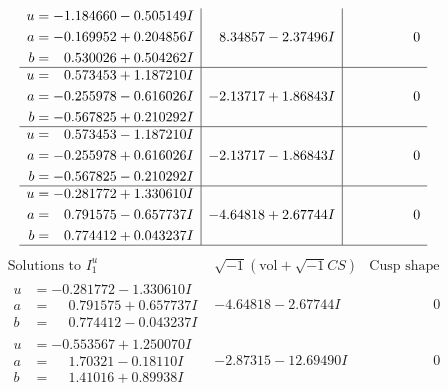 \documentclass[1p]{elsarticle_modified}
\theoremstyle{definition}
\newcommand{\I}{\sqrt{-1}}
\begin{document}
$$\begin{array}{c|c|c}
\begin{aligned}
u &= -1.184660 - 0.505149 I \\
a &= -0.169952 + 0.204856 I \\
b &= \phantom{-}0.530026 + 0.504262 I\end{aligned}
 & \phantom{-}8.34857 - 2.37496 I & \phantom{-0.000000 } 0 \\ \hline\begin{aligned}
u &= \phantom{-}0.573453 + 1.187210 I \\
a &= -0.255978 - 0.616026 I \\
b &= -0.567825 + 0.210292 I\end{aligned}
 & -2.13717 + 1.86843 I & \phantom{-0.000000 } 0 \\ \hline\begin{aligned}
u &= \phantom{-}0.573453 - 1.187210 I \\
a &= -0.255978 + 0.616026 I \\
b &= -0.567825 - 0.210292 I\end{aligned}
 & -2.13717 - 1.86843 I & \phantom{-0.000000 } 0 \\ \hline\begin{aligned}
u &= -0.281772 + 1.330610 I \\
a &= \phantom{-}0.791575 - 0.657737 I \\
b &= \phantom{-}0.774412 + 0.043237 I\end{aligned}
 & -4.64818 + 2.67744 I & \phantom{-0.000000 } 0\\
 \hline 
 \end{array}$$\newpage$$\begin{array}{c|c|c}  
\text{Solutions to }I^u_{1}& \I (\text{vol} + \sqrt{-1}CS) & \text{Cusp shape}\\
 \hline 
\begin{aligned}
u &= -0.281772 - 1.330610 I \\
a &= \phantom{-}0.791575 + 0.657737 I \\
b &= \phantom{-}0.774412 - 0.043237 I\end{aligned}
 & -4.64818 - 2.67744 I & \phantom{-0.000000 } 0 \\ \hline\begin{aligned}
u &= -0.553567 + 1.250070 I \\
a &= \phantom{-}1.70321 - 0.18110 I \\
b &= \phantom{-}1.41016 + 0.89938 I\end{aligned}
 & -2.87315 - 12.69490 I & \phantom{-0.000000 } 0 \\ \hline\begin{aligned}

\end{aligned}
\end{array}$$
\end{document}
